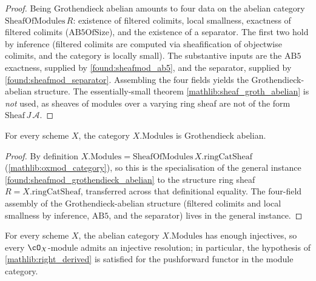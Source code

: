 \begin{proof}
  \leanok
  Being Grothendieck abelian amounts to four data on the abelian category
  \(\mathrm{SheafOfModules}\,R\): existence of filtered colimits, local smallness,
  exactness of filtered colimits (\(\mathrm{AB5OfSize}\)), and the existence of a
  separator.  The first two hold by inference (filtered colimits are computed via
  sheafification of objectwise colimits, and the category is locally small).  The
  substantive inputs are the \(\mathrm{AB5}\) exactness, supplied by
  \cref{found:sheafmod_ab5}, and the separator, supplied by
  \cref{found:sheafmod_separator}.  Assembling the four fields yields the
  Grothendieck-abelian structure.  The essentially-small theorem
  \cref{mathlib:sheaf_groth_abelian} is \emph{not} used, as sheaves of modules over
  a varying ring sheaf are not of the form \(\mathrm{Sheaf}\,J\,\mathcal A\).
\end{proof}

\begin{lemma}
  \label{found:modules_grothendieck_abelian}
  For every scheme \(X\), the category \(X.\mathrm{Modules}\) is Grothendieck
  abelian.
\end{lemma}

\begin{proof}
  \leanok
  By definition \(X.\mathrm{Modules}=\mathrm{SheafOfModules}\,X.\mathrm{ringCatSheaf}\)
  (\cref{mathlib:oxmod_category}), so this is the specialisation of the general
  instance \cref{found:sheafmod_grothendieck_abelian} to the structure ring sheaf
  \(R=X.\mathrm{ringCatSheaf}\), transferred across that definitional equality.  The
  four-field assembly of the Grothendieck-abelian structure (filtered colimits and
  local smallness by inference, \(\mathrm{AB5}\), and the separator) lives in the
  general instance.
\end{proof}

\begin{lemma}
  \label{found:has_injective_resolutions}
  For every scheme \(X\), the abelian category \(X.\mathrm{Modules}\) has enough
  injectives, so every \(\cO_X\)-module admits an injective resolution; in
  particular, the hypothesis of \cref{mathlib:right_derived} is satisfied for
  the pushforward functor in the module category.
\end{lemma}

